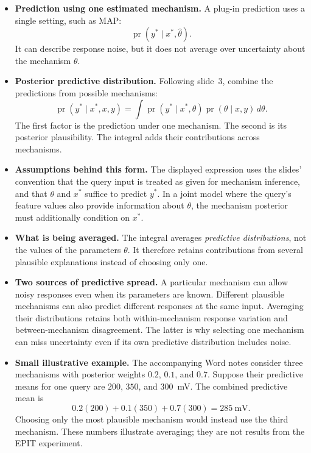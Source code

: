 \documentclass[11pt]{article}
\newcommand{\pr}{\operatorname{pr}}
\newenvironment{notes}
  {\begin{itemize}\setlength{\itemsep}{0.45em}\setlength{\parsep}{0pt}}
  {\end{itemize}}
\begin{document}
\begin{notes}
    \item \textbf{Prediction using one estimated mechanism.}
    A plug-in prediction uses a single setting, such as MAP:
    \[
        \pr(y^\ast\mid x^\ast,\widehat\theta).
    \]
    It can describe response noise, but it does not average over
    uncertainty about the mechanism \(\theta\).

    \item \textbf{Posterior predictive distribution.}
    Following slide~3, combine the predictions from possible
    mechanisms:
    \begin{equation}
        \pr(y^\ast\mid x^\ast,x,y)
        =
        \int
        \pr(y^\ast\mid x^\ast,\theta)
        \pr(\theta\mid x,y)\,d\theta.
        \label{eq:posterior-predictive}
    \end{equation}
    The first factor is the prediction under one mechanism.
    The second is its posterior plausibility. The integral adds
    their contributions across mechanisms.

    \item \textbf{Assumptions behind this form.} The displayed
    expression uses the slides' convention that the query input
    is treated as given for mechanism inference, and that
    \(\theta\) and \(x^\ast\) suffice to predict \(y^\ast\).
    In a joint model where the query's feature values also provide
    information about \(\theta\), the mechanism posterior must
    additionally condition on \(x^\ast\).

    \item \textbf{What is being averaged.} The integral averages
    \emph{predictive distributions}, not the values of the
    parameters \(\theta\). It therefore retains contributions from
    several plausible explanations instead of choosing only one.

    \item \textbf{Two sources of predictive spread.}
    A particular mechanism can allow noisy responses even when
    its parameters are known. Different plausible mechanisms can
    also predict different responses at the same input. Averaging
    their distributions retains both within-mechanism response
    variation and between-mechanism disagreement. The latter is
    why selecting one mechanism can miss uncertainty even if its
    own predictive distribution includes noise.

    \item \textbf{Small illustrative example.} The accompanying
    Word notes consider three mechanisms with posterior weights
    \(0.2\), \(0.1\), and \(0.7\). Suppose their predictive means
    for one query are \(200\), \(350\), and \(300\)~mV.
    The combined predictive mean is
    \[
        0.2(200)+0.1(350)+0.7(300)=285\ \text{mV}.
    \]
    Choosing only the most plausible mechanism would instead use
    the third mechanism. These numbers illustrate averaging;
    they are not results from the EPIT experiment.


\end{notes}
\end{document}
